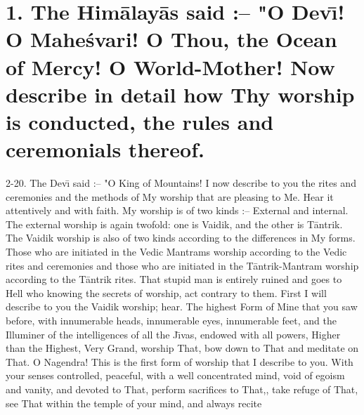 \chapter{1. The Him\=alay\=as said :-- "O Dev\={\i}! O Mahe\'svari! O Thou, the Ocean of Mercy! O World-Mother! Now describe in detail how Thy worship is conducted, the rules and ceremonials thereof.}
2-20. The Dev\={\i} said :-- "O King of Mountains! I now describe to you the rites and ceremonies and the methods of My worship that are pleasing to Me. Hear it attentively and with faith. My worship is of two kinds :-- External and internal. The external worship is again twofold: one is Vaidik, and the other is T\=antrik. The Vaidik worship is also of two kinds according to the differences in My forms. Those who are initiated in the Vedic Mantrams worship according to the Vedic rites and ceremonies and those who are initiated in the T\=antrik-Mantram worship according to the T\=antrik rites. That stupid man is entirely ruined and goes to Hell who knowing the secrets of worship, act contrary to them. First I will describe to you the Vaidik worship; hear. The highest Form of Mine that you saw before, with innumerable heads, innumerable eyes, innumerable feet, and the Illuminer of the intelligences of all the J\={\i}vas, endowed with all powers, Higher than the Highest, Very Grand, worship That, bow down to That and meditate on That. O Nagendra! This is the first form of worship that I describe to you. With your senses controlled, peaceful, with a well concentrated mind, void of egoism and vanity, and devoted to That, perform sacrifices to That,, take refuge of That, see That within the temple of your mind, and always recite

